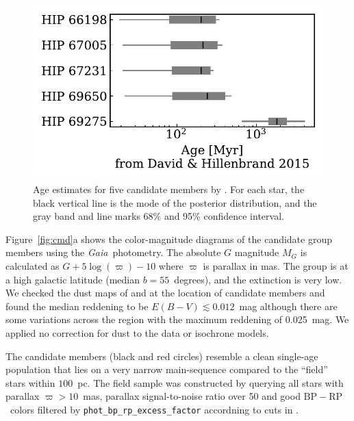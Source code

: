 \documentclass[modern,letterpaper]{aastex61}
\newcommand{\project}[1]{\textsl{#1}}
\newcommand{\gaia}{\project{Gaia}}
\newcommand{\bprp}{\ensuremath{\mathrm{BP}-\mathrm{RP}}}
\begin{document}
\begin{figure}
  \centering
  \includegraphics{age_DavidHillenbrand2015.pdf}
  \caption{Age estimates for five candidate members by \citet{2015ApJ...804..146D}.
    For each star, the black vertical line is the mode of the posterior
    distribution, and the gray band and line marks 68\% and 95\% confidence
    interval.
  }
  \label{fig:age_DavidHillenbrand2015}
\end{figure}

Figure~\ref{fig:cmd}a shows the color-magnitude diagrams of the candidate group
members using the \gaia\ photometry.
The absolute $G$ magnitude $M_G$ is calculated as $G + 5\log(\varpi) -10$ where
$\varpi$ is parallax in mas.
The group is at a high galactic latitude (median $b=55$~degrees),
and the extinction is very low.
We checked the dust maps of \citet{1998ApJ...500..525S} and
\citet{2017ApJ...846...38L}
at the location of candidate members and found the median reddening to be
$E(B-V)\lesssim 0.012$~mag although there are some variations across the region with
the maximum reddening of 0.025~mag.
We applied no correction for dust to the data or isochrone models.

The candidate members (black and red circles) resemble a clean single-age population
that lies on a very narrow main-sequence compared to the ``field'' stars within $100$~pc.
The field sample was constructed by querying all stars with parallax $\varpi>10$~mas,
parallax signal-to-noise ratio over 50 and good \bprp\ colors filtered by
\texttt{phot\_bp\_rp\_excess\_factor} accordning to cuts in \citet{2018arXiv180409378G}.
\end{document}
